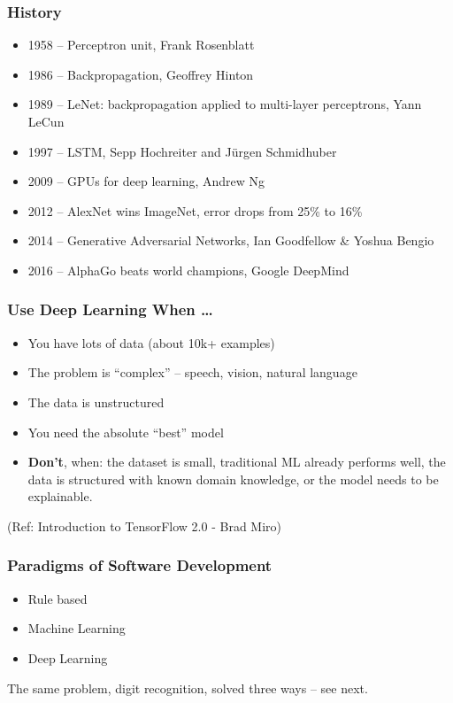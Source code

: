 \begin{frame}[fragile] \frametitle{History}
\begin{itemize}
\item 1958 -- Perceptron unit, Frank Rosenblatt
\item 1986 -- Backpropagation, Geoffrey Hinton
\item 1989 -- LeNet: backpropagation applied to multi-layer perceptrons, Yann LeCun
\item 1997 -- LSTM, Sepp Hochreiter and J\"urgen Schmidhuber
\item 2009 -- GPUs for deep learning, Andrew Ng
\item 2012 -- AlexNet wins ImageNet, error drops from 25\% to 16\%
\item 2014 -- Generative Adversarial Networks, Ian Goodfellow \& Yoshua Bengio
\item 2016 -- AlphaGo beats world champions, Google DeepMind
\end{itemize}
\end{frame}

\begin{frame}[fragile] \frametitle{Use Deep Learning When \ldots}
	\begin{itemize}
	\item You have lots of data (about 10k+ examples)
	\item The problem is ``complex'' -- speech, vision, natural language
	\item The data is unstructured
	\item You need the absolute ``best'' model
	\end{itemize}
	\begin{itemize}
	\item[] \textbf{Don't}, when: the dataset is small, traditional ML already performs well, the data is structured with known domain knowledge, or the model needs to be explainable.
	\end{itemize}
\tiny{(Ref: Introduction to TensorFlow 2.0 - Brad Miro)}
\end{frame}

\begin{frame}[fragile] \frametitle{Paradigms of Software Development}
\begin{itemize}
\item Rule based
\item Machine Learning
\item Deep Learning
\end{itemize}
The same problem, digit recognition, solved three ways -- see next.
\end{frame}

